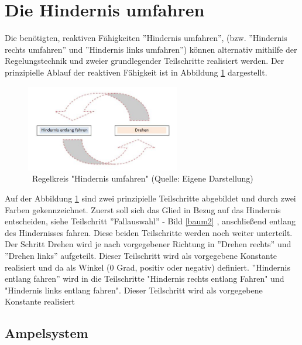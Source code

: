 \newpage
\renewcommand{\autoren}{Valentyn Chepil}
\section{Die Hindernis umfahren}

Die benötigten, reaktiven Fähigkeiten ”Hindernis umfahren”, (bzw. ”Hindernis rechts umfahren” und ”Hindernis links umfahren”) können alternativ mithilfe der Regelungstechnik und zweier grundlegender Teilschritte realisiert werden. Der prinzipielle Ablauf der reaktiven Fähigkeit ist in Abbildung \ref{bild_HUR} dargestellt. 

\begin{figure}[!h]  %
	\centering\includegraphics[width=0.6\textwidth]{images/Bild-HUR.jpg}
	\caption{ \ Regelkreis "Hindernis umfahren" \newline (Quelle: Eigene Darstellung)}
	\label{bild_HUR} %
\end{figure}

Auf der Abbildung \ref{bild_HUR} sind zwei prinzipielle Teilschritte abgebildet und durch zwei Farben gekennzeichnet. Zuerst soll sich das Glied in Bezug auf das Hindernis entscheiden, siehe Teilschritt ”Fallauswahl” - Bild \ref{baum2} , anschließend entlang des Hindernisses fahren. Diese beiden Teilschritte werden noch weiter unterteilt. Der Schritt Drehen wird je nach vorgegebener Richtung in ”Drehen rechts” und ”Drehen links” aufgeteilt. Dieser Teilschritt wird als vorgegebene Konstante realisiert und da als Winkel (0 Grad, positiv oder negativ) definiert. ”Hindernis entlang fahren” wird in die Teilschritte "Hindernis rechts entlang Fahren" und  "Hindernis links entlang fahren". Dieser Teilschritt wird als vorgegebene Konstante realisiert

\subsection{Ampelsystem}

